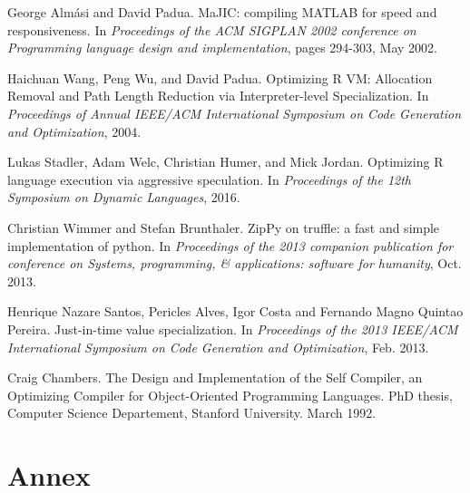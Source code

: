 \documentclass[twoside,11pt,a4paper]{article}
\newcommand{\bibproceeding}[5]{
	\bibitem{#1}	%
		#2.		%
		#3.		%
		In \textit{#4},		%
		#5.		%
}
\begin{document}
\begin{thebibliography}{99}
\bibproceeding{majic}
	{George Almási and David Padua}
	{MaJIC: compiling MATLAB for speed and responsiveness}
	{Proceedings of the ACM SIGPLAN 2002 conference on Programming language design and implementation}
	{pages 294-303, May 2002}
	
\bibproceeding{rspec}
	{Haichuan Wang, Peng Wu, and David Padua}
	{Optimizing R VM: Allocation Removal and Path Length Reduction via Interpreter-level Specialization}
	{Proceedings of Annual IEEE/ACM International Symposium on Code Generation and Optimization}
	{2004}

\bibproceeding{fastr}
	{Lukas Stadler, Adam Welc, Christian Humer, and Mick Jordan}
	{Optimizing R language execution via aggressive speculation}
	{Proceedings of the 12th Symposium on Dynamic Languages}
	{2016}
	
\bibproceeding{zippy}
	{Christian Wimmer and Stefan Brunthaler}
	{ZipPy on truffle: a fast and simple implementation of python}
	{Proceedings of the 2013 companion publication for conference on Systems, programming, \& applications: software for humanity}
	{Oct. 2013}
	
\bibproceeding{jsvalue}
	{Henrique Nazare Santos, Pericles Alves, Igor Costa and Fernando Magno Quintao Pereira}
	{Just-in-time value specialization}
	{Proceedings of the 2013 IEEE/ACM International Symposium on Code Generation and Optimization}
	{Feb. 2013}
	
	Craig Chambers.
	The Design and Implementation of the Self Compiler, an  Optimizing  Compiler  for  Object-Oriented  Programming  Languages.
	PhD thesis, Computer Science Departement, Stanford University.
	March 1992.

\end{thebibliography}

\newpage
\section*{Annex}
\label{sec:annex}
\thispagestyle{basic}

\end{document}
